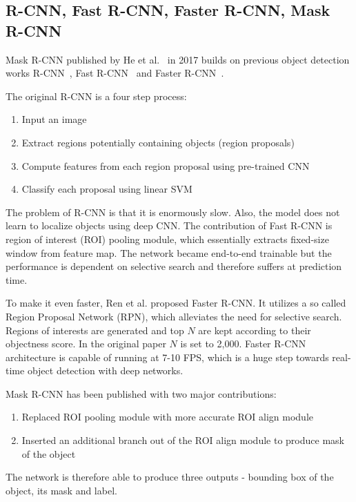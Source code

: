 \subsection{R-CNN, Fast R-CNN, Faster R-CNN, Mask R-CNN}
\label{sec:semantic_seg_cnn:maskrcnn}

Mask R-CNN published by He et al.~\cite{bib:he2017mask} in 2017 builds on previous
object detection works R-CNN~\cite{bib:girshick2014rich},
Fast R-CNN~\cite{bib:girshick2015fast} and Faster R-CNN~\cite{bib:ren2015faster}.

The original R-CNN is a four step process:
\begin{enumerate}
	\item Input an image
	\item Extract regions potentially containing objects (region proposals)
	\item Compute features from each region proposal using pre-trained CNN
	\item Classify each proposal using linear SVM
\end{enumerate}

The problem of R-CNN is that it is enormously slow. Also, the model does not learn to
localize objects using deep CNN. The contribution of Fast R-CNN is region of
interest (ROI) pooling module, which essentially extracts fixed-size window
from feature map. The network became end-to-end trainable but the performance
is dependent on selective search and therefore suffers at prediction time.

To make it even faster, Ren et al. proposed Faster R-CNN. It utilizes a so called
Region Proposal Network (RPN), which alleviates the need for selective search. Regions
of interests are generated and top $N$ are kept according to their objectness
score. In the original paper $N$ is set to 2,000.
Faster R-CNN architecture is capable of running at 7-10 FPS, which is a huge step towards
real-time object detection with deep networks.

Mask R-CNN has been published with two major contributions:
\begin{enumerate}
	\item Replaced ROI pooling module with more accurate ROI align module
	\item Inserted an additional branch out of the ROI align module to produce 
	mask of the object
\end{enumerate}

The network is therefore able to produce three outputs - bounding box of the object,
its mask and label.

